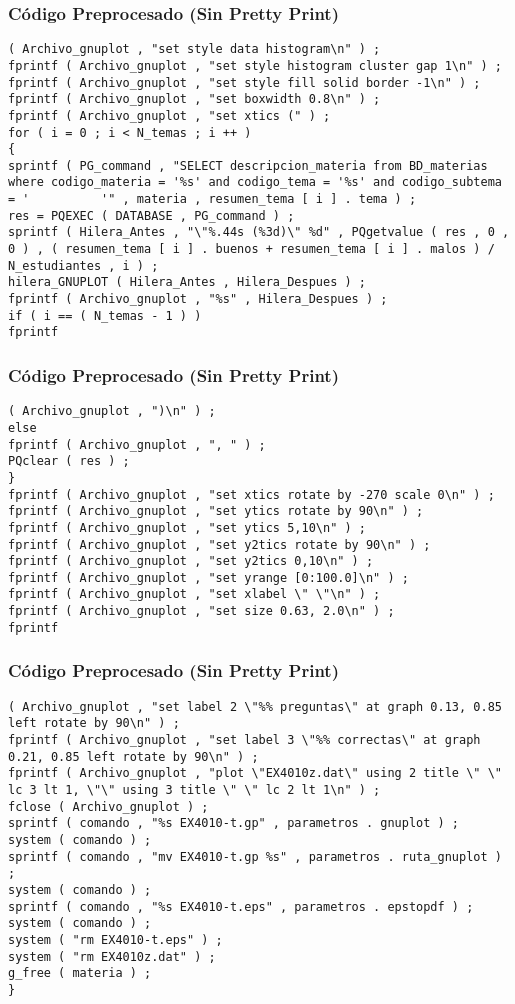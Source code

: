 \documentclass{beamer}
\begin{document}
\begin{frame}[fragile]
\frametitle{C\'odigo Preprocesado (Sin Pretty Print)}
\begin{lstlisting}[style=CStyle]
( Archivo_gnuplot , "set style data histogram\n" ) ; 
fprintf ( Archivo_gnuplot , "set style histogram cluster gap 1\n" ) ; 
fprintf ( Archivo_gnuplot , "set style fill solid border -1\n" ) ; 
fprintf ( Archivo_gnuplot , "set boxwidth 0.8\n" ) ; 
fprintf ( Archivo_gnuplot , "set xtics (" ) ; 
for ( i = 0 ; i < N_temas ; i ++ ) 
{ 
sprintf ( PG_command , "SELECT descripcion_materia from BD_materias where codigo_materia = '%s' and codigo_tema = '%s' and codigo_subtema = '          '" , materia , resumen_tema [ i ] . tema ) ; 
res = PQEXEC ( DATABASE , PG_command ) ; 
sprintf ( Hilera_Antes , "\"%.44s (%3d)\" %d" , PQgetvalue ( res , 0 , 0 ) , ( resumen_tema [ i ] . buenos + resumen_tema [ i ] . malos ) / N_estudiantes , i ) ; 
hilera_GNUPLOT ( Hilera_Antes , Hilera_Despues ) ; 
fprintf ( Archivo_gnuplot , "%s" , Hilera_Despues ) ; 
if ( i == ( N_temas - 1 ) ) 
fprintf \end{lstlisting}
\end{frame}
\begin{frame}[fragile]
\frametitle{C\'odigo Preprocesado (Sin Pretty Print)}
\begin{lstlisting}[style=CStyle]
( Archivo_gnuplot , ")\n" ) ; 
else 
fprintf ( Archivo_gnuplot , ", " ) ; 
PQclear ( res ) ; 
} 
fprintf ( Archivo_gnuplot , "set xtics rotate by -270 scale 0\n" ) ; 
fprintf ( Archivo_gnuplot , "set ytics rotate by 90\n" ) ; 
fprintf ( Archivo_gnuplot , "set ytics 5,10\n" ) ; 
fprintf ( Archivo_gnuplot , "set y2tics rotate by 90\n" ) ; 
fprintf ( Archivo_gnuplot , "set y2tics 0,10\n" ) ; 
fprintf ( Archivo_gnuplot , "set yrange [0:100.0]\n" ) ; 
fprintf ( Archivo_gnuplot , "set xlabel \" \"\n" ) ; 
fprintf ( Archivo_gnuplot , "set size 0.63, 2.0\n" ) ; 
fprintf \end{lstlisting}
\end{frame}
\begin{frame}[fragile]
\frametitle{C\'odigo Preprocesado (Sin Pretty Print)}
\begin{lstlisting}[style=CStyle]
( Archivo_gnuplot , "set label 2 \"%% preguntas\" at graph 0.13, 0.85 left rotate by 90\n" ) ; 
fprintf ( Archivo_gnuplot , "set label 3 \"%% correctas\" at graph 0.21, 0.85 left rotate by 90\n" ) ; 
fprintf ( Archivo_gnuplot , "plot \"EX4010z.dat\" using 2 title \" \" lc 3 lt 1, \"\" using 3 title \" \" lc 2 lt 1\n" ) ; 
fclose ( Archivo_gnuplot ) ; 
sprintf ( comando , "%s EX4010-t.gp" , parametros . gnuplot ) ; 
system ( comando ) ; 
sprintf ( comando , "mv EX4010-t.gp %s" , parametros . ruta_gnuplot ) ; 
system ( comando ) ; 
sprintf ( comando , "%s EX4010-t.eps" , parametros . epstopdf ) ; 
system ( comando ) ; 
system ( "rm EX4010-t.eps" ) ; 
system ( "rm EX4010z.dat" ) ; 
g_free ( materia ) ; 
} \end{lstlisting}
\end{frame}
\end{document}
